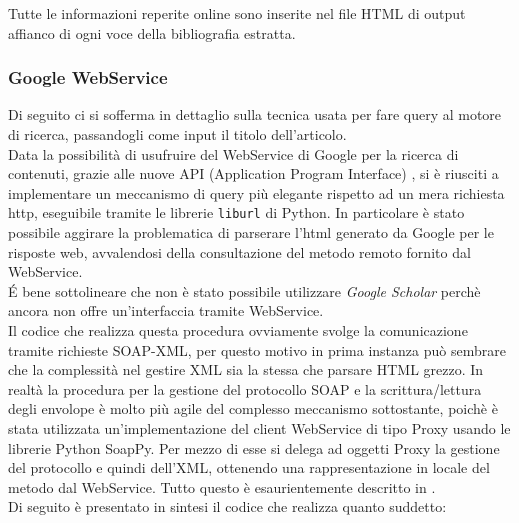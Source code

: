 Tutte le informazioni reperite online sono inserite nel file HTML di output affianco di ogni voce della bibliografia estratta.
\\

\subsubsection{Google WebService}

Di seguito ci si sofferma in dettaglio sulla tecnica usata per fare query al motore di ricerca, passandogli come input il titolo dell'articolo.
\\ 
Data la possibilità di usufruire del WebService di Google per la ricerca di contenuti, grazie alle nuove API (Application Program Interface) \cite{GWS}, si è riusciti a implementare un meccanismo di query più elegante rispetto ad un mera richiesta http, eseguibile tramite le librerie \texttt{liburl} di Python. In particolare è stato possibile aggirare la problematica di parserare l'html generato da Google per le risposte web, avvalendosi della consultazione del metodo remoto fornito dal WebService.
\\
\'E bene sottolineare che non è stato possibile utilizzare \textit{Google Scholar} perchè ancora non offre un'interfaccia  tramite WebService.
\\
Il codice che realizza questa procedura ovviamente svolge la comunicazione tramite richieste SOAP-XML, per questo motivo in prima instanza può sembrare che la complessità nel gestire XML sia la stessa che parsare HTML grezzo. In realtà la procedura per la gestione del protocollo SOAP e la scrittura/lettura degli envolope è molto più agile del complesso meccanismo sottostante, poichè è stata utilizzata un'implementazione del client WebService di tipo Proxy usando le librerie Python SoapPy. Per mezzo di esse si delega ad oggetti Proxy la gestione del protocollo e quindi dell'XML, ottenendo una rappresentazione in locale del metodo dal WebService. Tutto questo è esaurientemente descritto in \cite{ibm-py-ws}.
\\
Di seguito è presentato in sintesi il codice che realizza quanto suddetto:

